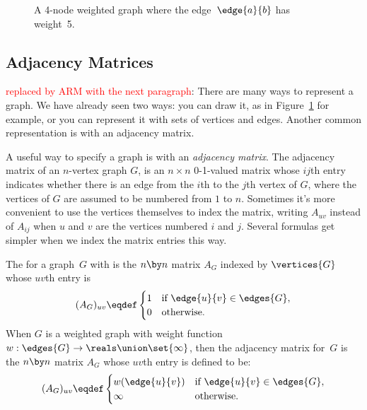 \begin{figure}


\caption{A 4-node weighted graph where the edge~$\edge{a}{b}$ has
  weight~5.}
\label{fig:weighted_graph}
\end{figure}

\subsection{Adjacency Matrices}

\begin{editingnotes}
  \textcolor{red}{replaced by ARM with the next paragraph}: There are many
  ways to represent a graph.  We have already seen two ways: you can draw
  it, as in Figure~\ref{fig:weighted_graph} for example, or you can
  represent it with sets of vertices and edges.  Another common
  representation is with an adjacency matrix.
\end{editingnotes}

A useful way to specify a graph is with an \emph{adjacency matrix}.  The
adjacency matrix of an $n$-vertex graph $G$, is an $n \times n$ 0-1-valued
matrix whose $ij$th entry indicates whether there is an edge from the
$i$th to the $j$th vertex of $G$, where the vertices of $G$ are assumed to
be numbered from $1$ to $n$.  Sometimes it's more convenient to use the
vertices themselves to index the matrix, writing $A_{uv}$ instead of
$A_{ij}$ when $u$ and $v$ are the vertices numbered $i$ and $j$.  Several
formulas get simpler when we index the matrix entries this way.

\begin{definition}\label{def:adjacency_matrix}
The  for a graph~$G$ with
is the $n \by n$ matrix $A_G$  indexed by $\vertices{G}$ whose $uv$th entry is
\begin{equation*}
    (A_G)_{uv} \eqdef \begin{cases}
                1 & \text{if $\edge{u}{v} \in \edges{G}$}, \\
                0 & \text{otherwise.}
              \end{cases}
\end{equation*}
When $G$ is a weighted graph with weight function $w: \edges{G} \to
\reals\union \set{\infty}$, then the adjacency matrix for~$G$ is the $n
\by n$ matrix $A_G$ whose $uv$th entry is defined to be:
\begin{equation*}
      (A_G)_{uv} \eqdef \begin{cases}
                w(\edge{u}{v}) & \text{if $\edge{u}{v} \in \edges{G}$}, \\
                \infty         & \text{otherwise.}
              \end{cases}
\end{equation*}
\end{definition}

